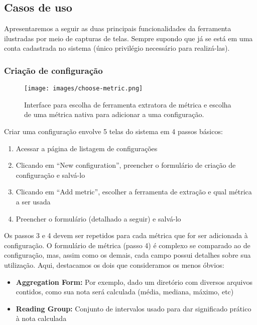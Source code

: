 \documentclass[10pt]{article}
\begin{document}
  \subsection{Casos de uso}
  Apresentaremos a seguir as duas principais funcionalidades da ferramenta ilustradas por meio de capturas de telas. Sempre supondo que já se está em uma conta cadastrada no sistema (único privilégio necessário para realizá-las).
    \subsubsection{Criação de configuração}
    \begin{figure}[H]
      \centering
      \texttt{[image: images/choose-metric.png]}
      \caption{Interface para escolha de ferramenta extratora de métrica e escolha de uma métrica nativa para adicionar a uma configuração.}
      \label{fig:choose-metric}
    \end{figure}
    Criar uma configuração envolve 5 telas do sistema em 4 passos básicos:
    \begin{enumerate}
      \item Acessar a página de listagem de configurações
      \item Clicando em ``New configuration'', preencher o formulário de criação de configuração e salvá-lo
      \item Clicando em ``Add metric'', escolher a ferramenta de extração e qual métrica a ser usada
      \item Preencher o formulário (detalhado a seguir) e salvá-lo
    \end{enumerate}
    Os passos 3 e 4 devem ser repetidos para cada métrica que for ser adicionada à configuração. O formulário de métrica (passo 4) é complexo se comparado ao de configuração, mas, assim como os demais, cada campo possui detalhes sobre sua utilização. Aqui, destacamos os dois que consideramos os menos óbvios:
    \begin{itemize}
      \item \textbf{Aggregation Form:} Por exemplo, dado um diretório com diversos arquivos contidos, como sua nota será calculada (média, mediana, máximo, etc)
      \item \textbf{Reading Group:} Conjunto de intervalos usado para dar significado prático à nota calculada
    \end{itemize}
\end{document}
